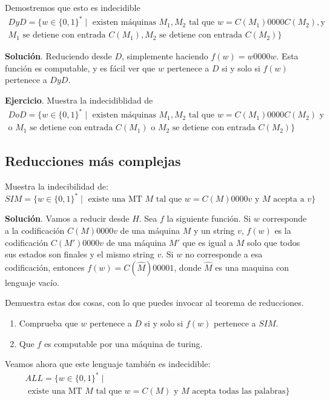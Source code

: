 \documentclass[12pt]{article}
\begin{document}
Demostremos que esto es indecidible
\begin{multline*}
DyD = \{w \in \{0,1\}^* \mid  
\text{ existen máquinas } M_1,M_2 \text{ tal que } w = C(M_1)0000C(M_2), \text{y} \\ M_1 \text{ se detiene con entrada } C(M_1), M_2 \text{ se detiene con entrada } C(M_2) \}
\end{multline*}

\medskip
\noindent
\textbf{Solución}. Reduciendo desde $D$, simplemente haciendo $f(w) = w0000w$. Esta función es computable, y es fácil ver que $w$ pertenece a $D$ si y solo si 
$f(w)$ pertenece a $DyD$. 


\medskip
\noindent
\textbf{Ejercicio}. Muestra la indecidiblidad de 
\begin{multline*}
DoD = \{w \in \{0,1\}^* \mid 
\text{ existen máquinas } M_1,M_2 \text{ tal que } w = C(M_1)0000C(M_2) \text{ y} \\ \text{o } M_1 \text{ se detiene con entrada } C(M_1) \text{ o } M_2 \text{ se detiene con entrada } C(M_2) \}
\end{multline*}

\subsection{Reducciones más complejas}

Muestra la indecibilidad de: 
$$
SIM = \{w \in \{0,1\}^* \mid \text{ existe una MT } M \text{ tal que } w = C(M)0000v \text{ y } M \text{ acepta a } v\}
$$

\medskip
\noindent
\textbf{Solución}. Vamos a reducir desde $H$. Sea $f$ la siguiente función. 
Si $w$ corresponde a la codificación $C(M)0000v$ de una máquina $M$ y un string $v$, $f(w)$ es la codificación $C(M')0000v$ de una máquina 
$M'$ que es igual a $M$ solo que todos sus estados son finales y el mismo string $v$. Si $w$ no corresponde a esa codificación, entonces $f(w) = C(\hat M)00001$, donde 
$\hat M$ es una maquina con lenguaje 
vacío. 

Demuestra estas dos cosas, con lo que puedes invocar al teorema de reducciones. 
\begin{enumerate}
\item Comprueba que $w$ pertenece a $D$ si y solo si $f(w)$ pertenece a $SIM$. 
\item Que $f$ es computable por una máquina de turing. 
\end{enumerate}


Veamos ahora que este lenguaje también es indecidible: 
\begin{multline*}
ALL = \{w \in \{0,1\}^* \mid \\ 
\text{ existe una MT } M \text{ tal que } w = C(M) \text{ y } M \text{ acepta todas las palabras}\}
\end{multline*}
\end{document}
